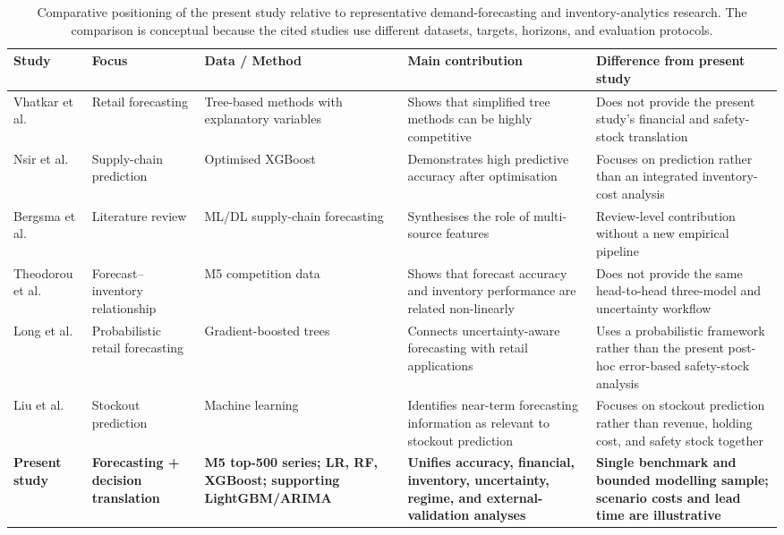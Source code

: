 \begin{table}[!t]
\centering
\caption{Comparative positioning of the present study relative to representative demand-forecasting and inventory-analytics research. The comparison is conceptual because the cited studies use different datasets, targets, horizons, and evaluation protocols.}
\label{tab:literature}
\scriptsize
\begin{adjustbox}{width=\textwidth}
\begin{tabular}{p{2.5cm} p{2.7cm} p{3.1cm} p{3.0cm} p{4.2cm}}
\toprule
\textbf{Study} & \textbf{Focus} & \textbf{Data / Method} & \textbf{Main contribution} & \textbf{Difference from present study} \\
\midrule
Vhatkar et al. \cite{OptimizedHyperparams2025} & Retail forecasting & Tree-based methods with explanatory variables & Shows that simplified tree methods can be highly competitive & Does not provide the present study's financial and safety-stock translation \\
Nsir et al. \cite{Nsir2025XGBoost} & Supply-chain prediction & Optimised XGBoost & Demonstrates high predictive accuracy after optimisation & Focuses on prediction rather than an integrated inventory-cost analysis \\
Bergsma et al. \cite{Bergsma2025InventoryML} & Literature review & ML/DL supply-chain forecasting & Synthesises the role of multi-source features & Review-level contribution without a new empirical pipeline \\
Theodorou et al. \cite{Theodorou2025Inventory} & Forecast--inventory relationship & M5 competition data & Shows that forecast accuracy and inventory performance are related non-linearly & Does not provide the same head-to-head three-model and uncertainty workflow \\
Long et al. \cite{Long2025ProbRetail} & Probabilistic retail forecasting & Gradient-boosted trees & Connects uncertainty-aware forecasting with retail applications & Uses a probabilistic framework rather than the present post-hoc error-based safety-stock analysis \\
Liu et al. \cite{Liu2025Stockout} & Stockout prediction & Machine learning & Identifies near-term forecasting information as relevant to stockout prediction & Focuses on stockout prediction rather than revenue, holding cost, and safety stock together \\
\textbf{Present study} & \textbf{Forecasting + decision translation} & \textbf{M5 top-500 series; LR, RF, XGBoost; supporting LightGBM/ARIMA} & \textbf{Unifies accuracy, financial, inventory, uncertainty, regime, and external-validation analyses} & \textbf{Single benchmark and bounded modelling sample; scenario costs and lead time are illustrative} \\
\bottomrule
\end{tabular}
\end{adjustbox}
\end{table}

